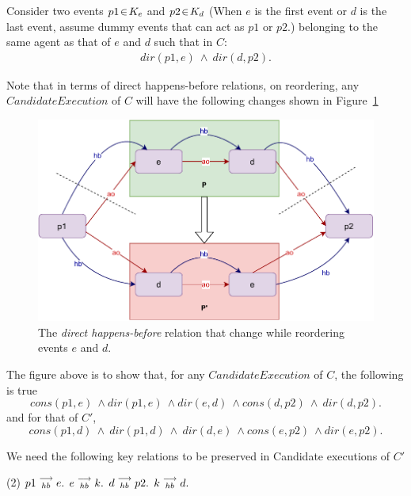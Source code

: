     Consider two events $p1\!\in\!K_e$ and $p2\!\in\!K_d$ (When $e$ is the first event or $d$ is the last event, assume dummy events that can act as $p1$ or $p2$.) belonging to the same agent as that of $e$ and $d$ such that in $C$:
    \begin{align*}
        dir(p1,e)\ \wedge\ dir(d,p2).
    \end{align*}
    
    Note that in terms of direct happens-before relations, on reordering, any $Candidate Execution$ of $C$ will have the following changes shown in Figure~\ref{reord:preserve_hb(b)}
    \begin{figure}[H]
        \centering
        \includegraphics[scale=0.7]{5.InstructionReordering/4.ValidReorderingCandidate/ProofParts/Part1/part1(b).pdf}
        \caption{The \textit{direct happens-before} relation that change while reordering events $e$ and $d$.}
        \label{reord:preserve_hb(b)}
    \end{figure}
    
    The figure above is to show that, for any $Candidate Execution$ of $C$, the following is true
    \[
        cons(p1,e) \ \wedge dir(p1,e) \ \wedge dir(e,d) \ \wedge cons(d,p2) \ \wedge \ dir(d,p2).
    \]
    and for that of $C'$,
    \[
        cons(p1,d) \ \wedge \ dir(p1,d) \ \wedge \ dir(d,e) \ \wedge cons(e,p2) \ \wedge dir(e,p2).
    \]
    
    We need the following key relations to be preserved in Candidate executions of $C'$ 
    \begin{tasks}(2)
        \task $p1\stackrel{\longrightarrow}{_{hb}}e.$
        \task $e\stackrel{\longrightarrow}{_{hb}}k.$
        \task $d\stackrel{\longrightarrow}{_{hb}}p2.$
        \task $k\stackrel{\longrightarrow}{_{hb}}d.$ 
    \end{tasks}

